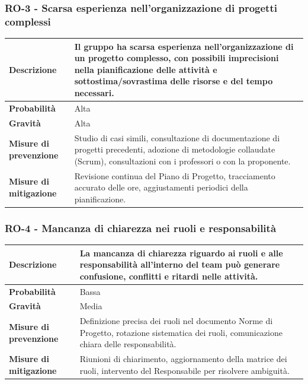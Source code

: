 \documentclass[11pt,a4paper]{article}
\begin{document}
\subsubsection{RO-3 - Scarsa esperienza nell'organizzazione di progetti complessi}
\begin{center}
\begin{tabular}{|p{3cm}|p{12cm}|}
    \hline
    \textbf{Descrizione} & Il gruppo ha scarsa esperienza nell'organizzazione di un progetto complesso, con possibili imprecisioni nella pianificazione delle attività e sottostima/sovrastima delle risorse e del tempo necessari. \\
    \hline
    \textbf{Probabilità} & Alta \\
    \hline
    \textbf{Gravità} & Alta \\
    \hline
    \textbf{Misure di prevenzione} & Studio di casi simili, consultazione di documentazione di progetti precedenti, adozione di metodologie collaudate (Scrum), consultazioni con i professori o con la proponente. \\
    \hline
    \textbf{Misure di mitigazione} & Revisione continua del Piano di Progetto, tracciamento accurato delle ore, aggiustamenti periodici della pianificazione. \\
    \hline
\end{tabular}
\end{center}

\subsubsection{RO-4 - Mancanza di chiarezza nei ruoli e responsabilità}
\begin{center}
\begin{tabular}{|p{3cm}|p{12cm}|}
    \hline
    \textbf{Descrizione} & La mancanza di chiarezza riguardo ai ruoli e alle responsabilità all'interno del team può generare confusione, conflitti e ritardi nelle attività. \\
    \hline
    \textbf{Probabilità} & Bassa \\
    \hline
    \textbf{Gravità} & Media \\
    \hline
    \textbf{Misure di prevenzione} & Definizione precisa dei ruoli nel documento Norme di Progetto, rotazione sistematica dei ruoli, comunicazione chiara delle responsabilità. \\
    \hline
    \textbf{Misure di mitigazione} & Riunioni di chiarimento, aggiornamento della matrice dei ruoli, intervento del Responsabile per risolvere ambiguità. \\
    \hline
\end{tabular}
\end{center}
\end{document}
